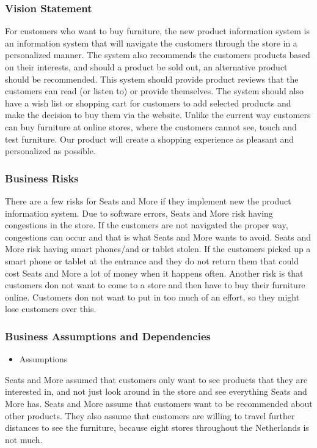 \documentclass[a4paper]{article}
\begin{document}
\subsubsection*{Vision Statement}
For customers who want to buy furniture, the new product information system is an information system that will navigate the customers through the store in a personalized manner. The system also recommends the customers products based on their interests, and should a product be sold out, an alternative product should be recommended. This system should provide product reviews that the customers can read (or listen to) or provide themselves. The system should also have a wish list or shopping cart for customers to add selected products and make the decision to buy them via the website. Unlike the current way customers can buy furniture at online stores, where the customers cannot see, touch and test furniture. Our product will create a shopping experience as pleasant and personalized as possible.

\subsubsection*{Business Risks}
There are a few risks for Seats and More if they implement new the product information system. Due to software errors, Seats and More risk having congestions in the store. If the customers are not navigated the proper way, congestions can occur and that is what Seats and More wants to avoid. 
Seats and More risk having smart phones/and or tablet stolen. If the customers picked up a smart phone or tablet at the entrance and they do not return them that could cost Seats and More a lot of money when it happens often. 
Another risk is that customers don not want to come to a store and then have to buy their furniture online. 
Customers don not want to put in too much of an effort, so they might lose customers over this.

\subsubsection*{Business Assumptions and Dependencies}
\begin{itemize}
\item Assumptions
\end{itemize}
Seats and More assumed that customers only want to see products that they are interested in, and not just look around in the store and see everything Seats and More has.
Seats and More assume that customers want to be recommended about other products.
They also assume that customers are willing to travel further distances to see the furniture, because eight stores throughout the Netherlands is not much.
\end{document}
